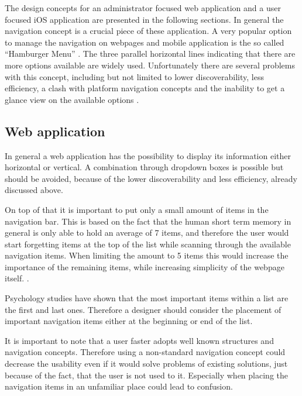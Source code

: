 The design concepts for an administrator focused web application and a user focused iOS application are presented in the following sections. In general the navigation concept is a crucial piece of these application. A very popular option to manage the navigation on webpages and mobile application is the so called \enquote{Hamburger Menu} \cite{Abreu:2014aa}. The three parallel horizontal lines indicating that there are more options available are widely used. Unfortunately there are several problems with this concept, including but not limited to lower discoverability, less efficiency, a clash with platform navigation concepts and the inability to get a glance view on the available options \cite{Abreu:2014aa}.

\subsection{Web application}

In general a web application has the possibility to display its information either horizontal or vertical. A combination through dropdown boxes is possible but should be avoided, because of the lower discoverability and less efficiency, already discussed above. \cite{Crestodina:2015aa}

On top of that it is important to put only a small amount of items in the navigation bar. This is based on the fact that the human short term memory in general is only able to hold an average of 7 items, and therefore the user would start forgetting items at the top of the list while scanning through the available navigation items. When limiting the amount to 5 items this would increase the importance of the remaining items, while increasing simplicity of the webpage itself. \cite{Crestodina:2015aa}. 

Psychology studies have shown that the most important items within a list are the first and last ones. Therefore a designer should consider the placement of important navigation items either at the beginning or end of the list. \cite{Crestodina:2015aa}

It is important to note that a user faster adopts well known structures and navigation concepts. Therefore using a non-standard navigation concept could decrease the usability even if it would solve problems of existing solutions, just because of the fact, that the user is not used to it. Especially when placing the navigation items in an unfamiliar place could lead to confusion. \cite{Crestodina:2015aa}

